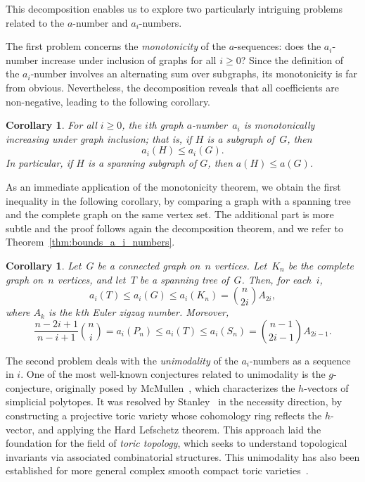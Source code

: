 \documentclass[10pt]{amsart}
\theoremstyle{plain}
\newtheorem{corollary}[theorem]{Corollary}
\numberwithin{equation}{section}
\theoremstyle{definition}
\begin{document}
This decomposition enables us to explore two particularly intriguing problems related to the $a$-number and $a_i$-numbers.

The first problem concerns the \emph{monotonicity} of the $a$-sequences: does the $a_i$-number increase under inclusion of graphs for all $i \geq 0$?
Since the definition of the $a_i$-number involves an alternating sum over subgraphs, its monotonicity is far from obvious. 
Nevertheless, the decomposition reveals that all coefficients are non-negative, leading to the following corollary.

\begin{corollary}\label{coro:monoto}
  For all $i \geq 0$, the $i$th graph $a$-number~$a_i$ is monotonically increasing under graph inclusion; that is, if $H$ is a subgraph of~$G$, then
    $$
    a_i(H) \leq a_i(G).
    $$
    In particular, if $H$ is a spanning subgraph of $G$, then $a(H) \leq a(G)$.
\end{corollary}

As an immediate application of the monotonicity theorem, we obtain the first inequality in the following corollary, by comparing a graph with a spanning tree and the complete graph on the same vertex set.
The additional part is more subtle and the proof follows again the decomposition theorem, and we refer to Theorem~\ref{thm:bounds_a_i_numbers}.
\begin{corollary}\label{coro:upperlower}
  Let~$G$ be a connected graph on~$n$ vertices.
  Let~$K_n$ be the complete graph on~$n$ vertices, and let~$T$ be a spanning tree of~$G$.
  Then, for each~$i$,
  ~$$
    a_i(T) \le a_i(G) \le a_i(K_n) = \binom{n}{2i} A_{2i},
  $$
  where $A_{k}$ is the $k$th Euler zigzag number.
  Moreover, 
  $$
    \frac{n-2i+1}{n-i+1} \binom{n}{i}=a_i(P_n) \leq a_i (T) \leq a_i (S_n) = \binom{n-1}{2i-1} A_{2i-1}.
  $$
\end{corollary}


The second problem deals with the \emph{unimodality} of the $a_i$-numbers as a sequence in $i$. 
One of the most well-known conjectures related to unimodality is the $g$-conjecture, originally posed by McMullen~\cite{McMullen1971}, which characterizes the $h$-vectors of simplicial polytopes. 
It was resolved by Stanley~\cite{Stanley1980} in the necessity direction, by constructing a projective toric variety whose cohomology ring reflects the $h$-vector, and applying the Hard Lefschetz theorem.
This approach laid the foundation for the field of \emph{toric topology}, which seeks to understand topological invariants via associated combinatorial structures.
This unimodality has also been established for more general complex smooth compact toric varieties~\cite{Adiprasito2018,Karu-Xiao2023}.
\end{document}
